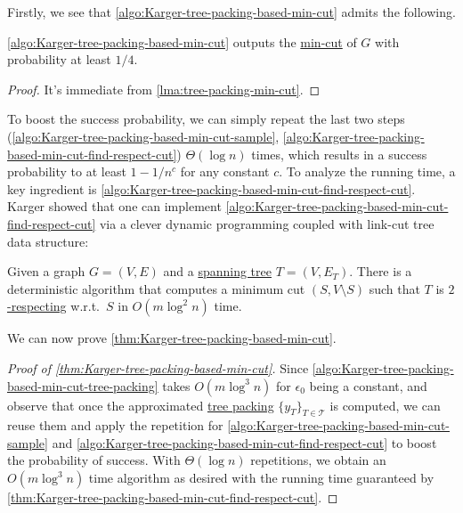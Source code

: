 Firstly, we see that \autoref{algo:Karger-tree-packing-based-min-cut} admits the following.

\begin{lemma}
	\autoref{algo:Karger-tree-packing-based-min-cut} outputs the \hyperref[prb:global-min-cut]{min-cut} of \(G\) with probability at least \(1 / 4\).
\end{lemma}
\begin{proof}
	It's immediate from \autoref{lma:tree-packing-min-cut}.
\end{proof}

To boost the success probability, we can simply repeat the last two steps (\autoref{algo:Karger-tree-packing-based-min-cut-sample}, \autoref{algo:Karger-tree-packing-based-min-cut-find-respect-cut}) \(\Theta (\log n)\) times, which results in a success probability to at least \(1 - 1 / n^c\) for any constant \(c\). To analyze the running time, a key ingredient is \autoref{algo:Karger-tree-packing-based-min-cut-find-respect-cut}. Karger showed that one can implement \autoref{algo:Karger-tree-packing-based-min-cut-find-respect-cut} via a clever dynamic programming coupled with link-cut tree data structure:

\begin{theorem}\label{thm:Karger-tree-packing-based-min-cut-find-respect-cut}
	Given a graph \(G = (V, E)\) and a \hyperref[def:spanning-tree]{spanning tree} \(T = (V, E_T)\). There is a deterministic algorithm that computes a minimum cut \((S, V \setminus S)\) such that \(T\) is \hyperref[def:respect]{\(2\)-respecting} w.r.t.\ \(S\) in \(O(m \log ^2 n)\) time.
\end{theorem}

We can now prove \autoref{thm:Karger-tree-packing-based-min-cut}.

\begin{proof}[Proof of \autoref{thm:Karger-tree-packing-based-min-cut}]
	Since \autoref{algo:Karger-tree-packing-based-min-cut-tree-packing} takes \(O(m \log ^3 n)\) for \(\epsilon _0\) being a constant, and observe that once the approximated \hyperref[prb:tree-packing]{tree packing} \(\{ y_T \} _{T \in \mathcal{T} }\) is computed, we can reuse them and apply the repetition for \autoref{algo:Karger-tree-packing-based-min-cut-sample} and \autoref{algo:Karger-tree-packing-based-min-cut-find-respect-cut} to boost the probability of success. With \(\Theta (\log n)\) repetitions, we obtain an \(O(m \log ^3 n)\) time algorithm as desired with the running time guaranteed by \autoref{thm:Karger-tree-packing-based-min-cut-find-respect-cut}.
\end{proof}

